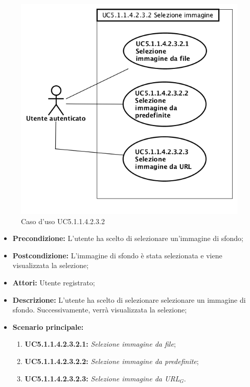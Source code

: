 \begin{figure}[h]
	\begin{center}
	\includegraphics[scale=0.6]{diagram/UC5-1-1-4-2-3-2.png}
	\caption{Caso d'uso UC5.1.1.4.2.3.2}
	\end{center}
\end{figure}
\begin{itemize}
	\item \textbf{Precondizione:} L'utente ha scelto di selezionare un'immagine di sfondo;
	\item \textbf{Postcondizione:} L'immagine di sfondo è stata selezionata e viene visualizzata la selezione;
	\item \textbf{Attori:} Utente registrato;
	\item \textbf{Descrizione:} L'utente ha scelto di selezionare selezionare un immagine di sfondo. Successivamente, verrà visualizzata la selezione;
	\item \textbf{Scenario principale:}
	\begin{enumerate}
		\item \textbf{ UC5.1.1.4.2.3.2.1:} \textit{ Selezione immagine da file};
		\item \textbf{ UC5.1.1.4.2.3.2.2:} \textit{ Selezione immagine da predefinite};
		\item \textbf{ UC5.1.1.4.2.3.2.3:} \textit{ Selezione immagine da URL$_G$}.
	\end{enumerate}
\end{itemize}
